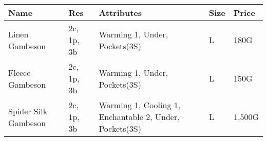 \begin{longtable}{p{3.5cm} | p{1.5cm} | p{5cm} | p{1cm} | p{1.25cm}}
	Name & Res &  Attributes & Size & Price\\ \hline
	Linen Gambeson & 2c, 1p, 3b & Warming 1, Under, Pockets(3S) & L & 180G\\

	Fleece Gambeson & 2c, 1p, 3b & Warming 1, Under, Pockets(3S) & L & 150G\\

	Spider Silk Gambeson & 2c, 1p, 3b & Warming 1, Cooling 1, Enchantable 2, Under, Pockets(3S) & L & 1,500G\\
\end{longtable}
%
%
%
%
%
%
%
%
